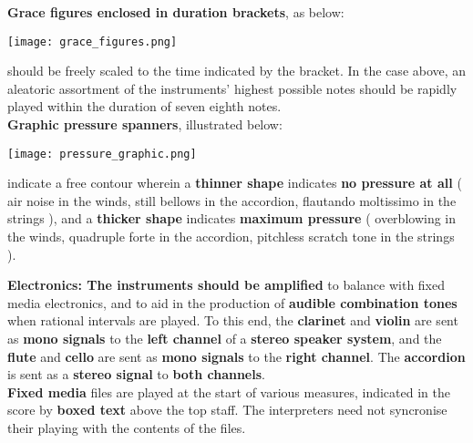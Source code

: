 \documentclass[12pt]{article}
\newcommand*\circled[1]{\tikz[baseline=(char.base)]{
            \node[shape=circle,draw,inner sep=1pt] (char) {#1};}}
\begin{document}
\textbf{\circled{6} Grace figures enclosed in duration brackets}, as below: \\
\begin{center}
\texttt{[image: grace\_figures.png]} \\
\end{center}
should be freely scaled to the time indicated by the bracket. In the case above, an aleatoric assortment of the instruments' highest possible notes should be rapidly played within the duration of seven eighth notes. \pagebreak \\
\textbf{\circled{7} Graphic pressure spanners}, illustrated below:  
\begin{center}
\texttt{[image: pressure\_graphic.png]} \\
\end{center}
indicate a free contour wherein a \textbf{thinner shape} indicates \textbf{no pressure at all} ( air noise in the winds, still bellows in the accordion, flautando moltissimo in the strings ), and a \textbf{thicker shape} indicates \textbf{maximum pressure} ( overblowing in the winds, quadruple forte in the accordion, pitchless scratch tone in the strings ).
\endgroup 


\begingroup
\textbf{Electronics: \circled{1} The instruments should be amplified} to balance with fixed media electronics, and to aid in the production of \textbf{audible combination tones} when rational intervals are played. To this end, the \textbf{clarinet} and \textbf{violin} are sent as \textbf{mono signals} to the \textbf{left channel} of a \textbf{stereo speaker system}, and the \textbf{flute} and \textbf{cello} are sent as \textbf{mono signals} to the \textbf{right channel}. The \textbf{accordion} is sent as a \textbf{stereo signal} to \textbf{both channels}. \\
\textbf{\circled{2} Fixed media} files are played at the start of various measures, indicated in the score by \textbf{boxed text} above the top staff. The interpreters need not syncronise their playing with the contents of the files. \\
\endgroup 
\end{document}
